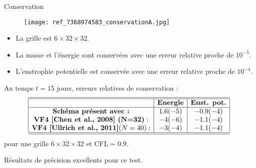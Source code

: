 \documentclass[11pt]{beamer}
\begin{document}

\begin{frame}{Conservation}
\begin{figure}
\texttt{[image: ref\_7368974583\_conservationA.jpg]}
\end{figure}
\begin{itemize}
\item La grille est $6 \times 32 \times 32$.
\item La masse et l'énergie sont conservées avec une erreur relative proche de $10^{-5}$.
\item L'enstrophie potentielle est conservée avec une erreur relative proche de $10^{-4}$.
\end{itemize}
\end{frame}





\begin{frame}{}
Au temps $t = 15$ jours, erreurs relatives de conservation :
\begin{equation*}
\begin{array}{|c|c|c|}
\hline
\hline
 & \textbf{Energie} & \textbf{Enst. pot.} \\
\hline
 \textbf{Schéma présent avec :} & 1.6 (-5) &-0.9 (-4) \\
 \textbf{VF4 [Chen et al., 2008] (N=32)} : & -4 (-6) & -1.1 (-4) \\
 \textbf{VF4 [Ullrich et al., 2011]} (N=40) : & -3 (-4) & -1.1 (-4) \\
\hline
\hline
\end{array}
\end{equation*}
pour une grille $6 \times 32 \times 32$ et CFL$=0.9$.

\begin{block}{}
Résultats de précision excellents pour ce test.
\end{block}
\end{frame}
\end{document}
